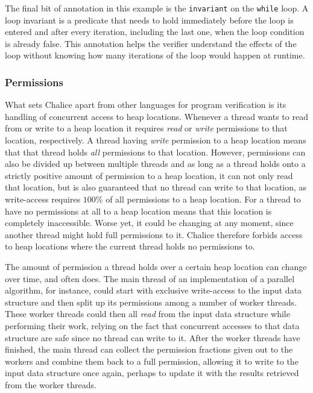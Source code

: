 The final bit of annotation in this example is the \lstinline[language=Chalice]!invariant! on the \lstinline[language=Chalice]!while! loop. 
A loop invariant is a predicate that needs to hold immediately before the loop is entered and after every iteration, including the last one, when the loop condition is already false.
This annotation helps the verifier understand the effects of the loop without knowing how many iterations of the loop would happen at runtime.

\subsubsection{Permissions}

What sets Chalice apart from other languages for program verification is its handling of concurrent access to heap locations. 
Whenever a thread wants to read from or write to a heap location it requires \emph{read} or \emph{write} permissions to that location, respectively. 
A thread having \emph{write} permission to a heap location means that that thread holds \emph{all} permissions to that location. 
However, permissions can also be divided up between multiple threads and as long as a thread holds onto a strictly positive amount of permission to a heap location, it can not only read that location, but is also guaranteed that no thread can write to that location, as write-access requires $100\%$ of all permissions to a heap location.
For a thread to have no permissions at all to a heap location means that this location is completely inaccessible. 
Worse yet, it could be changing at any moment, since another thread might hold full permissions to it.
Chalice therefore forbids access to heap locations where the current thread holds no permissions to.

The amount of permission a thread holds over a certain heap location can change over time, and often does.
The main thread of an implementation of a parallel algorithm, for instance, could start with exclusive write-access to the input data structure and then split up its permissions among a number of worker threads.
These worker threads could then all \emph{read} from the input data structure while performing their work, relying on the fact that concurrent accesses to that data structure are safe since no thread can write to it.
After the worker threads have finished, the main thread can collect the permission fractions given out to the workers and combine them back to a full permission, allowing it to write to the input data structure once again, perhaps to update it with the results retrieved from the worker threads.

